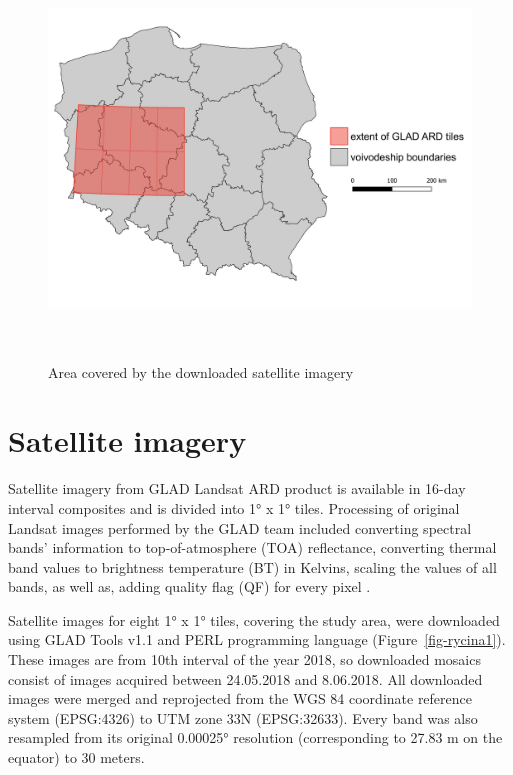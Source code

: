 \documentclass{amuthesis}
\begin{document}
\begin{figure}[H]

{\centering \includegraphics[width=5.875in,height=4.16667in]{./figures/study_area.png}

}

\caption{\label{fig-rycina2}Area covered by the downloaded satellite
imagery}

\end{figure}

\hypertarget{sec-sat}{%
\section{Satellite imagery}\label{sec-sat}}

Satellite imagery from GLAD Landsat ARD product is available in 16-day
interval composites and is divided into 1° x 1° tiles. Processing of
original Landsat images performed by the GLAD team included converting
spectral bands' information to top-of-atmosphere (TOA) reflectance,
converting thermal band values to brightness temperature (BT) in
Kelvins, scaling the values of all bands, as well as, adding quality
flag (QF) for every pixel \autocite{potapov_landsat_2020}.

Satellite images for eight 1° x 1° tiles, covering the study area, were
downloaded using GLAD Tools v1.1 and PERL programming language
(Figure~\ref{fig-rycina1}). These images are from 10th interval of the
year 2018, so downloaded mosaics consist of images acquired between
24.05.2018 and 8.06.2018. All downloaded images were merged and
reprojected from the WGS 84 coordinate reference system (EPSG:4326) to
UTM zone 33N (EPSG:32633). Every band was also resampled from its
original 0.00025° resolution (corresponding to 27.83 m on the equator)
to 30 meters.
\end{document}

